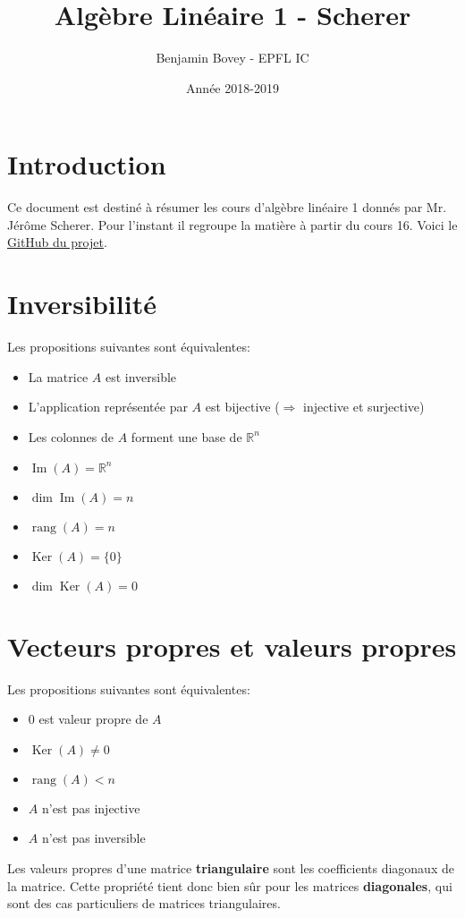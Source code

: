 \documentclass{article}
\title{Algèbre Linéaire 1 - Scherer}
\author{Benjamin Bovey -  EPFL IC}
\date{Année 2018-2019}
\numberwithin{equation}{section}
\DeclareMathOperator{\rang}{rang}
\DeclareMathOperator{\im}{Im}
\DeclareMathOperator{\ke}{Ker}
\begin{document}
\maketitle


\section*{Introduction}
Ce document est destiné à résumer les cours d'algèbre linéaire 1 donnés par Mr. Jérôme Scherer. Pour l'instant il regroupe la matière à partir du cours 16. Voici le \href{https://github.com/Arakniode/almighty-handbook-of-sleep-deprived-student}{GitHub du projet}.


\section{Inversibilité}
Les propositions suivantes sont équivalentes:
\begin{itemize}
	\item La matrice \(A\) est inversible
	\item L'application représentée par \(A\) est bijective (\(\Rightarrow\) injective et surjective)
	\item Les colonnes de \(A\) forment une base de \(\mathbb{R}^n\)
	\item \(\im(A) = \mathbb{R}^n\)
	\item \(\dim \im(A) = n\)
	\item \(\rang(A) = n\)
	\item \(\ke(A) = \{0\}\)
	\item \(\dim \ke(A) = 0\)
\end{itemize}


\section{Vecteurs propres et valeurs propres}
Les propositions suivantes sont équivalentes:
\begin{itemize}
	\item \(0\) est valeur propre de \(A\)
	\item \(\ke(A) \neq 0\)
	\item \(\rang(A) < n\)
	\item \(A\) n'est pas injective
	\item \(A\) n'est pas inversible
\end{itemize}
Les valeurs propres d'une matrice \textbf{triangulaire} sont les coefficients diagonaux de la matrice. Cette propriété tient donc bien sûr pour les matrices \textbf{diagonales}, qui sont des cas particuliers de matrices triangulaires.
\end{document}
